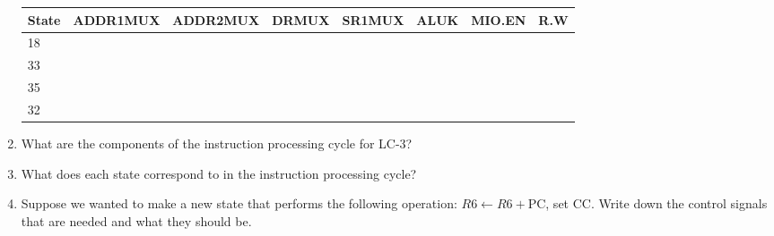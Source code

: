 \documentclass{article}
\begin{document}
\begin{enumerate}[label=\alph*]
\begin{table}[!h]
\begin{tabular}{|l|l|l|l|l|l|l|}
\end{tabular}
\end{table}
\begin{table}[!h]
\begin{tabular}{|l|l|l|l|l|l|l|l|}
\hline
\textbf{State} & \textbf{ADDR1MUX} & \textbf{ADDR2MUX} & \textbf{DRMUX} & \textbf{SR1MUX} & \textbf{ALUK} & \textbf{MIO.EN} & \textbf{R.W} \\ \hline
18             &                   &                   &                &                 &               &                 &              \\ \hline
33             &                   &                   &                &                 &               &                 &              \\ \hline
35             &                   &                   &                &                 &               &                 &              \\ \hline
32             &                   &                   &                &                 &               &                 &              \\ \hline
\end{tabular}
\end{table}
\item What are the components of the instruction processing cycle for LC-3? 
\item What does each state correspond to in the instruction processing cycle?
\item Suppose we wanted to make a new state that performs the following operation: $R6 \longleftarrow R6 + \text{PC}$, set CC.
Write down the control signals that are needed and what they should be.

\end{enumerate}

\newpage
\end{document}
